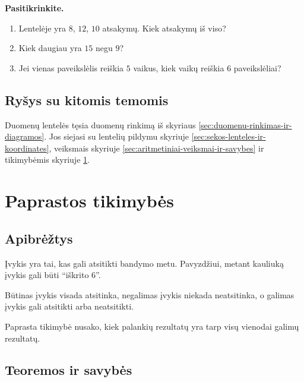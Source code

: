\textbf{Pasitikrinkite.}
\begin{enumerate}[label=\arabic*.]
\item Lentelėje yra \(8\), \(12\), \(10\) atsakymų. Kiek atsakymų iš viso?
\item Kiek daugiau yra \(15\) negu \(9\)?
\item Jei vienas paveikslėlis reiškia \(5\) vaikus, kiek vaikų reiškia \(6\) paveikslėliai?
\end{enumerate}

\subsection{Ryšys su kitomis temomis}

Duomenų lentelės tęsia duomenų rinkimą iš skyriaus \ref{sec:duomenu-rinkimas-ir-diagramos}. Jos siejasi su lentelių pildymu skyriuje \ref{sec:sekos-lenteles-ir-koordinates}, veiksmais skyriuje \ref{sec:aritmetiniai-veiksmai-ir-savybes} ir tikimybėmis skyriuje \ref{sec:paprastos-tikimybes}.

\section{Paprastos tikimybės}\label{sec:paprastos-tikimybes}

\subsection{Apibrėžtys}

\begin{apibreztis}
Įvykis yra tai, kas gali atsitikti bandymo metu. Pavyzdžiui, metant kauliuką įvykis gali būti ``iškrito \(6\)''.
\end{apibreztis}

\begin{apibreztis}
Būtinas įvykis visada atsitinka, negalimas įvykis niekada neatsitinka, o galimas įvykis gali atsitikti arba neatsitikti.
\end{apibreztis}

\begin{apibreztis}
Paprasta tikimybė nusako, kiek palankių rezultatų yra tarp visų vienodai galimų rezultatų.
\end{apibreztis}

\subsection{Teoremos ir savybės}

